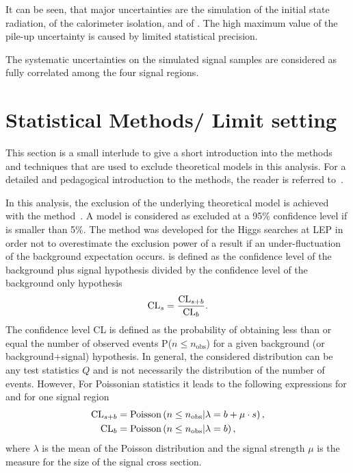 It can be seen, that major uncertainties are the simulation of the initial state radiation, of the calorimeter isolation, and of \ias.
The high maximum value of the pile-up uncertainty is caused by limited statistical precision.

The systematic uncertainties on the simulated signal samples are considered as fully correlated among the four signal regions.

\section{Statistical Methods/ Limit setting}

This section is a small interlude to give a short introduction into the methods and techniques that are used to exclude theoretical models in this analysis.
For a detailed and pedagogical introduction to the methods, the reader is referred to~\cite{bib:Ott_Thesis}.

In this analysis, the exclusion of the underlying theoretical model is achieved with the \CLs method~\cite{bib:CLS_1999,bib:CLS_2000,bib:CLS_2002}.
A model is considered as excluded at a 95\% confidence level if \CLs is smaller than 5\%.
The \CLs method was developed for the Higgs searches at LEP in order not to overestimate the exclusion power of a result if an  under-fluctuation of the background expectation occurs.
\CLs is defined as the confidence level of the background plus signal hypothesis divided by the confidence level of the background only hypothesis
\begin{equation*}
\text{CL}_{s} = \frac{\text{CL}_{s+b}}{\text{CL}_{b}}.
\end{equation*}
The confidence level CL is defined as the probability of obtaining less than or equal the number of observed events P($n\leq n_{\text{obs}}$) for a given background (or background+signal) hypothesis.
In general, the considered distribution can be any test statistics $Q$ and is not necessarily the distribution of the number of events.
However, For Poissonian statistics it leads to the following expressions for \CLsb and \CLb for one signal region
\begin{equation*}
\begin{split}
\text{CL}_{s+b} &= \text{Poisson}\left( n\leq n_{\text{obs}} |\lambda = b+\mu\cdot s   \right),\\
\text{CL}_{b}  &= \text{Poisson}\left( n \leq n_{\text{obs}} |\lambda = b   \right),
\end{split}
\end{equation*}
where $\lambda$ is the mean of the Poisson distribution and the signal strength $\mu$ is the measure for the size of the signal cross section.


